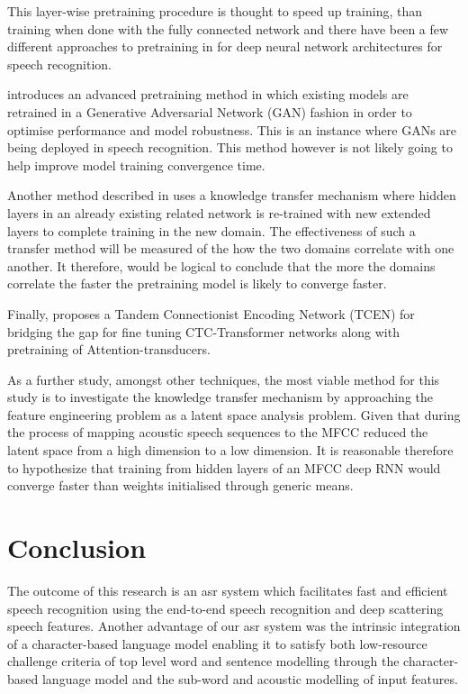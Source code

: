 This layer-wise pretraining procedure is thought to speed up training, than training when done with the fully connected network and there have been a few different approaches to pretraining in for deep neural network architectures for speech recognition. 

\cite{hendrycks2019using} introduces an advanced pretraining method in which existing models are retrained in a Generative Adversarial Network (GAN) fashion in order to optimise performance and model robustness.  This is an instance where GANs are being deployed in speech recognition.  This method however is not likely going to help improve model training convergence time.

Another method described in \citep{ramachandran2016unsupervised,} uses a knowledge transfer mechanism where hidden layers in an already existing related network is re-trained with new extended layers to complete training in the new domain.  The effectiveness of such a transfer method will be measured of the how the two domains correlate with one another. It therefore, would be logical to conclude that the more the domains correlate the faster the pretraining model is likely to converge faster.

Finally, \cite{wang2019bridging} proposes a Tandem Connectionist Encoding Network (TCEN) for bridging the gap for fine tuning CTC-Transformer networks along with pretraining of Attention-transducers.

As a further study, amongst other techniques, the most viable method for this study is to investigate the knowledge transfer mechanism by approaching the feature engineering problem as a latent space analysis problem.  Given that during the process of mapping acoustic speech sequences to the MFCC reduced the latent space from a high dimension to a low dimension.  It is reasonable therefore to hypothesize that training from hidden layers of an MFCC deep RNN would converge faster than weights initialised through generic means.

\startblue
\section{Conclusion}

The outcome of this research is an \acrshort{asr} system which facilitates fast and efficient speech recognition using the end-to-end speech recognition and deep scattering speech features.  Another advantage of our \acrshort{asr} system was the intrinsic integration of a character-based language model enabling it to satisfy both low-resource challenge criteria of top level word and sentence modelling through the character-based language model and the sub-word and acoustic modelling of input features.


